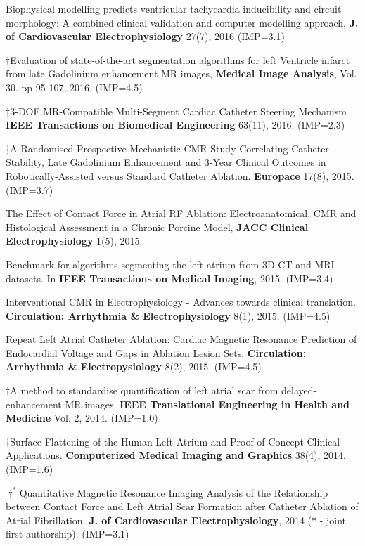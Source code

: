 \documentclass[letterpaper]{twentysecondcv} %
\begin{document}
\begin{etaremune}
\item Biophysical modelling predicts ventricular tachycardia inducibility and circuit morphology:  A combined clinical validation and computer modelling approach, \textbf{J. of Cardiovascular Electrophysiology} 27(7), 2016 (IMP=3.1)
\item $\dagger$Evaluation of state-of-the-art segmentation algorithms for left Ventricle infarct from late Gadolinium enhancement MR images, \textbf{Medical Image Analysis}, Vol. 30. pp 95-107, 2016. (IMP=4.5)
\item $\ddagger$3-DOF MR-Compatible Multi-Segment Cardiac Catheter Steering Mechanism \textbf{IEEE Transactions on Biomedical Engineering} 63(11), 2016. (IMP=2.3)
\item $\ddagger$A Randomised Prospective Mechanistic CMR Study Correlating Catheter Stability, Late Gadolinium Enhancement and 3-Year Clinical Outcomes in Robotically-Assisted versus Standard Catheter Ablation.  \textbf{Europace} 17(8), 2015. (IMP=3.7)
\item The Effect of Contact Force in Atrial RF Ablation: Electroanatomical, CMR and Histological Assessment in a Chronic Porcine Model, \textbf{JACC Clinical Electrophysiology} 1(5), 2015. 
\item Benchmark for algorithms segmenting the left atrium from 3D CT and MRI datasets. In \textbf{IEEE Transactions on Medical Imaging}, 2015. (IMP=3.4)
\item Interventional CMR in Electrophysiology - Advances towards clinical translation. \textbf{Circulation: Arrhythmia \& Electrophysiology} 8(1), 2015. (IMP=4.5)
\item Repeat Left Atrial Catheter Ablation: Cardiac Magnetic Resonance Prediction of Endocardial Voltage and Gaps in Ablation Lesion Sets. \textbf{Circulation: Arrhythmia \& Electropysiology} 8(2), 2015. (IMP=4.5)
\item $\dagger$A method to standardise quantification of left atrial scar from delayed-enhancement MR images. \textbf{IEEE Translational Engineering in Health and Medicine} Vol. 2, 2014. (IMP=1.0)
\item $\dagger$Surface Flattening of the Human Left Atrium and Proof-of-Concept Clinical Applications. \textbf{Computerized Medical Imaging and Graphics} 38(4), 2014. (IMP=1.6)
\item $\dagger^*$Quantitative Magnetic Resonance Imaging Analysis of the Relationship between Contact Force and Left Atrial Scar Formation after Catheter Ablation of Atrial Fibrillation. \textbf{J. of Cardiovascular Electrophysiology}, 2014 (* - joint first authorship). (IMP=3.1)

\end{etaremune}
\end{document}
